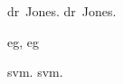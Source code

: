 \documentclass{article}
\begin{document}
\gls{dr}~Jones.
\gls{dr}~Jones.

\Gls{eg}, \gls{eg}

\gls{svm}. \gls{svm}.

\printglossaries
\end{document}
